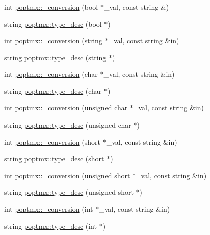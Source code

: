 \subsubsection*{}
\begin{DoxyCompactItemize}
\item 
int \hyperlink{group__poptmx_ga5f038edce4d0386b7e83b30b6237a7bc}{poptmx::\_\-conversion} (bool $\ast$\_\-val, const string \&)
\item 
string \hyperlink{group__poptmx_ga16de73eccc8b02faa7a860788c743cb9}{poptmx::type\_\-desc} (bool $\ast$)
\item 
int \hyperlink{group__poptmx_ga21bee06fd50cf04bfd1db2f8060e4786}{poptmx::\_\-conversion} (string $\ast$\_\-val, const string \&in)
\item 
string \hyperlink{group__poptmx_ga04141e981e0fc66aef2cc8978962c00d}{poptmx::type\_\-desc} (string $\ast$)
\item 
int \hyperlink{group__poptmx_ga334ee4f2cd8943b01c326e3311252757}{poptmx::\_\-conversion} (char $\ast$\_\-val, const string \&in)
\item 
string \hyperlink{group__poptmx_ga2fb0229d4f44757b6cbc1cd3638ff69a}{poptmx::type\_\-desc} (char $\ast$)
\item 
int \hyperlink{group__poptmx_gacdfbed39a9a6b0bb64bf102a527a4738}{poptmx::\_\-conversion} (unsigned char $\ast$\_\-val, const string \&in)
\item 
string \hyperlink{group__poptmx_gae324aca37a45028d45d8a03e44800bdd}{poptmx::type\_\-desc} (unsigned char $\ast$)
\item 
int \hyperlink{group__poptmx_ga1fd3ff64c414495b88515c4fca8ab404}{poptmx::\_\-conversion} (short $\ast$\_\-val, const string \&in)
\item 
string \hyperlink{group__poptmx_ga514af929248cebd06551f8855ce95f4b}{poptmx::type\_\-desc} (short $\ast$)
\item 
int \hyperlink{group__poptmx_ga4b42a8c89b0b4497e4aacf3d84efd30c}{poptmx::\_\-conversion} (unsigned short $\ast$\_\-val, const string \&in)
\item 
string \hyperlink{group__poptmx_ga68ec6040eea68ac1d802cc7ba4f3ec52}{poptmx::type\_\-desc} (unsigned short $\ast$)
\item 
int \hyperlink{group__poptmx_gae6b11c8af8149daef723bff847454b81}{poptmx::\_\-conversion} (int $\ast$\_\-val, const string \&in)
\item 
string \hyperlink{group__poptmx_gadf4ee0b75c06f7b7393825b7ee11e9b1}{poptmx::type\_\-desc} (int $\ast$)
\item 

\end{DoxyCompactItemize}
